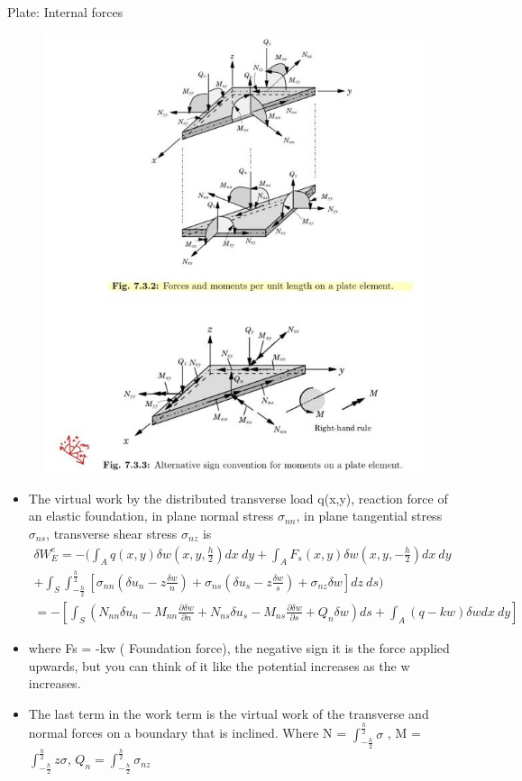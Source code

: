 	\begin{frame}{Plate: Internal forces}
		\begin{figure}
			\centering
			\includegraphics[width=0.6 \linewidth]{Figure/fig32} 		
		\end{figure}
	\end{frame}


	\begin{frame}
		\begin{itemize}
			\item The virtual work by the distributed transverse load q(x,y), reaction force of an elastic foundation, in plane normal stress $\sigma_{nn}$, in plane tangential stress $\sigma_{ns}$, transverse shear stress $\sigma_{nz}$ is 
			\begin{equation}
			\begin{aligned}
				\delta W_E^e = - (\int_A q(x,y) \delta w(x,y,\frac{h}{2}) dx~dy + 
				\int_A F_s(x,y) \delta w(x,y,-\frac{h}{2}) dx~dy
				\\	+ \int_S \int_{-\frac{h}{2}}^{\frac{h}{2}} \left[ \sigma_{nn} \left(\delta u_n - z \frac{\delta w}{n} \right) + \sigma_{ns} \left(\delta u_s - z \frac{\delta w}{s}\right) 
				+ \sigma_{nz}\delta w\right] dz~ds ) \\ 
				= - \left[ \int_S \left(N_{nn}\delta u_n - M_{nn}\frac{\partial \delta w}{\partial n}
							+ N_{ns}\delta u_s 
				            - M_{ns}\frac{\partial \delta w}{\partial s} + Q_n \delta w \right)ds
				            + \int_A (q-kw)\delta w dx~dy
				 \right] 
			\end{aligned}
			\end{equation}
			\item where Fs = -kw ( Foundation force), the negative sign it is the force applied upwards, but you can think of it like the potential increases as the w increases.
			\item The last term in the work term is the virtual work of the transverse and normal forces on a boundary that is inclined. Where N = $\int_{-\frac{h}{2}}^{\frac{h}{2}}\sigma$ ,  M = $\int_{-\frac{h}{2}}^{\frac{h}{2}}z\sigma$, $Q_n = \int_{-\frac{h}{2}}^{\frac{h}{2}}\sigma_{nz}$ 
		\end{itemize}
	\end{frame}


